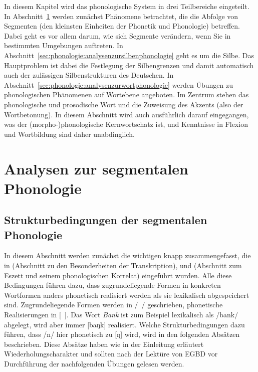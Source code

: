 In diesem Kapitel wird das phonologische System in drei Teilbereiche eingeteilt.
In Abschnitt~\ref{sec:phonologie:analysenzursegmentalenphonologie} werden zunächst Phänomene betrachtet, die die Abfolge von Segmenten (den kleinsten Einheiten der Phonetik und Phonologie) betreffen.
Dabei geht es vor allem darum, wie sich Segmente verändern, wenn Sie in bestimmten Umgebungen auftreten.
In Abschnitt~\ref{sec:phonologie:analysenzursilbenphonologie} geht es um die Silbe.
Das Hauptproblem ist dabei die Festlegung der Silbengrenzen und damit automatisch auch der zulässigen Silbenstrukturen des Deutschen.
In Abschnitt~\ref{sec:phonologie:analysenzurwortphonologie} werden Übungen zu phonologischen Phänomenen auf Wortebene angeboten.
Im Zentrum stehen das phonologische und prosodische Wort und die Zuweisung des Akzents (also der Wortbetonung).
In diesem Abschnitt wird auch ausführlich darauf eingegangen, was der (morpho-)phonologische Kernwortschatz ist, und Kenntnisse in Flexion und Wortbildung sind daher unabdinglich.

\section{Analysen zur segmentalen Phonologie}
\label{sec:phonologie:analysenzursegmentalenphonologie}

\subsection{Strukturbedingungen der segmentalen Phonologie}
\label{sec:phonologie:strukturbedingungendersegmentalenphonologie}

In diesem Abschnitt werden zunächst die wichtigen  knapp zusammengefasst, die in  (Abschnitt zu den Besonderheiten der Transkription),  und  (Abschnitt zum Eszett und seinem phonologischen Korrelat) eingeführt wurden.
Alle diese Bedingungen führen dazu, dass zugrundeliegende Formen in konkreten Wortformen anders phonetisch realisiert werden als sie lexikalisch abgespeichert sind.
Zugrundeliegende Formen werden in /~/ geschrieben, phonetische Realisierungen in [~].
Das Wort \textit{Bank} ist zum Beispiel lexikalisch als /bank/ abgelegt, wird aber immer [baŋk] realisiert.
Welche Strukturbedingungen dazu führen, dass /n/ hier phonetisch zu [ŋ] wird, wird in den folgenden Absätzen beschrieben.
Diese Absätze haben wie in der Einleitung erläutert Wiederholungscharakter und sollten nach der Lektüre von EGBD vor Durchführung der nachfolgenden Übungen gelesen werden.

